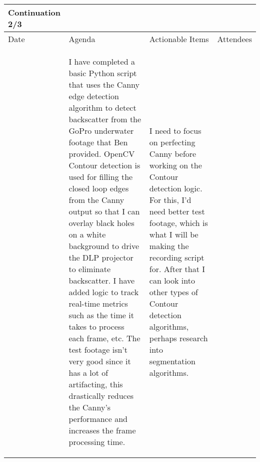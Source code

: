 \begin{table}[!h]
    \centering
    \begin{tabularx}{\textwidth}{|l|X|X|X|}
        \hline
        Continuation 2/3 \\
        \hline
        \hline
        Date & Agenda & Actionable Items & Attendees \\
        \hline
        \hline
        & 
        \begin{myitemize}
            \item I have completed a basic Python script that uses the Canny edge detection algorithm to detect backscatter from the GoPro underwater footage that Ben provided. OpenCV Contour detection is used for filling the closed loop edges from the Canny output so that I can overlay black holes on a white background to drive the DLP projector to eliminate backscatter. I have added logic to track real-time metrics such as the time it takes to process each frame, etc. The test footage isn't very good since it has a lot of artifacting, this drastically reduces the Canny's performance and increases the frame processing time.
        \end{myitemize} & 
        \begin{myitemize}
            \item I need to focus on perfecting Canny before working on the Contour detection logic. For this, I'd need better test footage, which is what I will be making the recording script for. After that I can look into other types of Contour detection algorithms, perhaps research into segmentation algorithms.
        \end{myitemize} &
        \\
        \hline
    \end{tabularx}
\end{table}

\pagebreak

